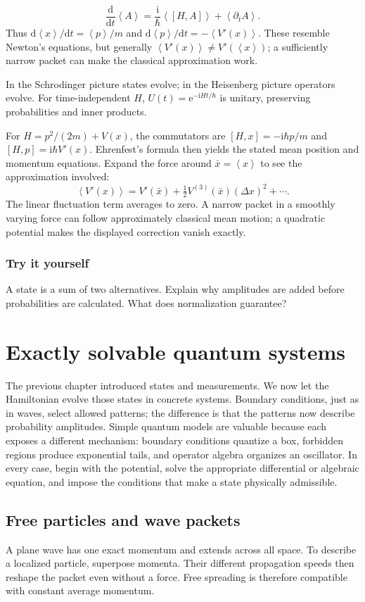 \documentclass[11pt,oneside]{book}
\newcommand{\dd}{\mathrm{d}}
\newcommand{\ii}{\mathrm{i}}
\newcommand{\ee}{\mathrm{e}}
\newcommand{\avg}[1]{\left\langle #1\right\rangle}
\newcommand{\od}[2]{\frac{\dd #1}{\dd #2}}
\theoremstyle{reviewstyle}
\newcommand{\learningcheck}[1]{\subsection*{Try it yourself}\noindent #1\par}
\begin{document}
\begin{equation}\od{}{t}\avg A=\frac{\ii}{\hbar}\avg{[H,A]}+\avg{\partial_t A}.\end{equation}
Thus $\dd\avg x/\dd t=\avg p/m$ and $\dd\avg p/\dd t=-\avg{V'(x)}$. These resemble Newton's equations, but generally $\avg{V'(x)}\neq V'(\avg x)$; a sufficiently narrow packet can make the classical approximation work.

In the Schrodinger picture states evolve; in the Heisenberg picture operators evolve. For time-independent $H$, $U(t)=\ee^{-\ii Ht/\hbar}$ is unitary, preserving probabilities and inner products.

For $H=p^2/(2m)+V(x)$, the commutators are $[H,x]=-\ii\hbar p/m$ and $[H,p]=\ii\hbar V'(x)$. Ehrenfest's formula then yields the stated mean position and momentum equations. Expand the force around $\bar x=\avg x$ to see the approximation involved:
\begin{equation}
\avg{V'(x)}=V'(\bar x)+\tfrac12V^{(3)}(\bar x)(\Delta x)^2+\cdots.
\end{equation}
The linear fluctuation term averages to zero. A narrow packet in a smoothly varying force can follow approximately classical mean motion; a quadratic potential makes the displayed correction vanish exactly.

\learningcheck{A state is a sum of two alternatives. Explain why amplitudes are added before probabilities are calculated. What does normalization guarantee?}

\chapter{Exactly solvable quantum systems}
The previous chapter introduced states and measurements. We now let the Hamiltonian evolve those states in concrete systems. Boundary conditions, just as in waves, select allowed patterns; the difference is that the patterns now describe probability amplitudes.
Simple quantum models are valuable because each exposes a different mechanism: boundary conditions quantize a box, forbidden regions produce exponential tails, and operator algebra organizes an oscillator. In every case, begin with the potential, solve the appropriate differential or algebraic equation, and impose the conditions that make a state physically admissible.

\section{Free particles and wave packets}
A plane wave has one exact momentum and extends across all space. To describe a localized particle, superpose momenta. Their different propagation speeds then reshape the packet even without a force. Free spreading is therefore compatible with constant average momentum.
\end{document}
